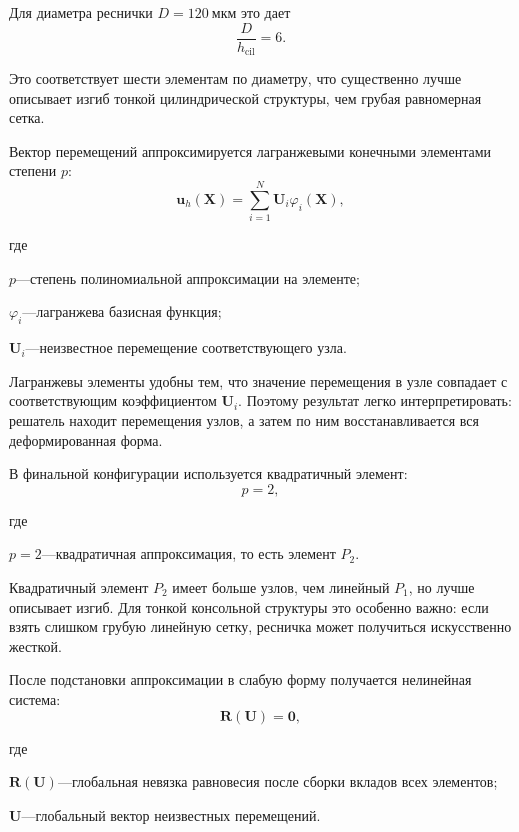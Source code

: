 \documentclass[14pt,a4paper]{extarticle}
\newif\ifwherefirst
\newcommand{\whereitem}[2]{%
    \ifwherefirst
        \wherefirstfalse
        #1\hspace{0.25em}---\hspace{0.25em}#2\par
    \else
        \noindent\hspace*{\parindent}\hphantom{где\enspace}#1\hspace{0.25em}---\hspace{0.25em}#2\par
    \fi
}
\newenvironment{whereblock}{%
    \vspace*{-1.55\baselineskip}%
    \begingroup
    \singlespacing
    \wherefirsttrue
    \par\indent где\enspace\ignorespaces
}{%
    \par\endgroup
    \par\vspace{\baselineskip}
}
\begin{document}
Для диаметра реснички \(D=120~\text{мкм}\) это дает
\begin{equation}
    \frac{D}{h_{\mathrm{cil}}}=6.
\end{equation}

Это соответствует шести элементам по диаметру, что существенно лучше описывает изгиб тонкой цилиндрической структуры, чем грубая равномерная сетка.

Вектор перемещений аппроксимируется лагранжевыми конечными элементами степени \(p\):
\begin{equation}
    \mathbf{u}_h(\mathbf{X})
    =
    \sum_{i=1}^{N}
    \mathbf{U}_i\varphi_i(\mathbf{X}),
\end{equation}
\begin{whereblock}
\whereitem{\(p\)}{степень полиномиальной аппроксимации на элементе;}
\whereitem{\(\varphi_i\)}{лагранжева базисная функция;}
\whereitem{\(\mathbf{U}_i\)}{неизвестное перемещение соответствующего узла.}
\end{whereblock}

Лагранжевы элементы удобны тем, что значение перемещения в узле совпадает с соответствующим коэффициентом \(\mathbf{U}_i\). Поэтому результат легко интерпретировать: решатель находит перемещения узлов, а затем по ним восстанавливается вся деформированная форма.

В финальной конфигурации используется квадратичный элемент:
\begin{equation}
    p=2,
\end{equation}
\begin{whereblock}
\whereitem{\(p=2\)}{квадратичная аппроксимация, то есть элемент \(P_2\).}
\end{whereblock}

Квадратичный элемент \(P_2\) имеет больше узлов, чем линейный \(P_1\), но лучше описывает изгиб. Для тонкой консольной структуры это особенно важно: если взять слишком грубую линейную сетку, ресничка может получиться искусственно жесткой.

После подстановки аппроксимации в слабую форму получается нелинейная система:
\begin{equation}
    \mathbf{R}(\mathbf{U})=\mathbf{0},
\end{equation}
\begin{whereblock}
\whereitem{\(\mathbf{R}(\mathbf{U})\)}{глобальная невязка равновесия после сборки вкладов всех элементов;}
\whereitem{\(\mathbf{U}\)}{глобальный вектор неизвестных перемещений.}
\end{whereblock}
\end{document}
